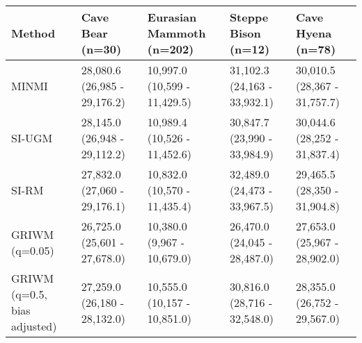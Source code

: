 
\begin{tabular}{lllll}
\toprule
Method & Cave Bear (n=30) & Eurasian Mammoth (n=202) & Steppe Bison (n=12) & Cave Hyena (n=78)\\
\midrule
MINMI & 28,080.6 (26,985 - 29,176.2) & 10,997.0 (10,599 - 11,429.5) & 31,102.3 (24,163 - 33,932.1) & 30,010.5 (28,367 - 31,757.7)\\
SI-UGM & 28,145.0 (26,948 - 29,112.2) & 10,989.4 (10,526 - 11,452.6) & 30,847.7 (23,990 - 33,984.9) & 30,044.6 (28,252 - 31,837.4)\\
SI-RM & 27,832.0 (27,060 - 29,176.1) & 10,832.0 (10,570 - 11,435.4) & 32,489.0 (24,473 - 33,967.5) & 29,465.5 (28,350 - 31,904.8)\\
GRIWM (q=0.05) & 26,725.0 (25,601 - 27,678.0) & 10,380.0 (9,967 - 10,679.0) & 26,470.0 (24,045 - 28,487.0) & 27,653.0 (25,967 - 28,902.0)\\
GRIWM (q=0.5, bias adjusted) & 27,259.0 (26,180 - 28,132.0) & 10,555.0 (10,157 - 10,851.0) & 30,816.0 (28,716 - 32,548.0) & 28,355.0 (26,752 - 29,567.0)\\
\bottomrule
\end{tabular}
